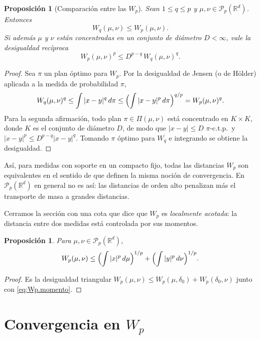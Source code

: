 \documentclass[12pt, a4paper]{amsbook}
\newcommand{\R}{{\mathbb R}}
\newtheorem{prop}[teo]{Proposición}
\theoremstyle{remark}
\theoremstyle{definition}
\numberwithin{section}{chapter}
\numberwithin{subsection}{section}
\numberwithin{equation}{section}
\numberwithin{figure}{chapter}
\begin{document}
\begin{prop}[Comparación entre las $W_p$]\label{prop.Wp.comparacion}
Sean $1\le q\le p$ y $\mu,\nu\in\mathcal P_p(\R^d)$. Entonces
\[
W_q(\mu,\nu)\le W_p(\mu,\nu).
\]
Si además $\mu$ y $\nu$ están concentradas en un conjunto de diámetro
$D<\infty$, vale la desigualdad recíproca
\[
W_p(\mu,\nu)^p\le D^{p-q}\,W_q(\mu,\nu)^q.
\]
\end{prop}

\begin{proof}
Sea $\pi$ un plan óptimo para $W_p$. Por la desigualdad de Jensen (o de
Hölder) aplicada a la medida de probabilidad $\pi$,
\[
W_q(\mu,\nu)^q\le\int|x-y|^q\,d\pi\le\Bigl(\int|x-y|^p\,d\pi\Bigr)^{q/p}=W_p(\mu,\nu)^q.
\]
Para la segunda afirmación, todo plan $\pi\in\Pi(\mu,\nu)$ está concentrado en
$K\times K$, donde $K$ es el conjunto de diámetro $D$, de modo que
$|x-y|\le D$ $\pi$-c.t.p.\ y $|x-y|^p\le D^{p-q}|x-y|^q$. Tomando $\pi$ óptimo
para $W_q$ e integrando se obtiene la desigualdad.
\end{proof}

Así, para medidas con soporte en un compacto fijo, todas las distancias $W_p$
son equivalentes en el sentido de que definen la misma noción de convergencia.
En $\mathcal P_p(\R^d)$ en general no es así: las distancias de orden alto
penalizan más el transporte de masa a grandes distancias.

Cerramos la sección con una cota que dice que $W_p$ es \emph{localmente
acotada}: la distancia entre dos medidas está controlada por sus momentos.

\begin{prop}\label{prop.Wp.cota.momentos}
Para $\mu,\nu\in\mathcal P_p(\R^d)$,
\[
W_p(\mu,\nu)\le\Bigl(\int|x|^p\,d\mu\Bigr)^{1/p}+\Bigl(\int|y|^p\,d\nu\Bigr)^{1/p}.
\]
\end{prop}

\begin{proof}
Es la desigualdad triangular $W_p(\mu,\nu)\le W_p(\mu,\delta_0)+W_p(\delta_0,\nu)$
junto con \eqref{eq:Wp.momento}.
\end{proof}

\section{Convergencia en $W_p$}\label{sec.Wp.convergencia}
\end{document}
